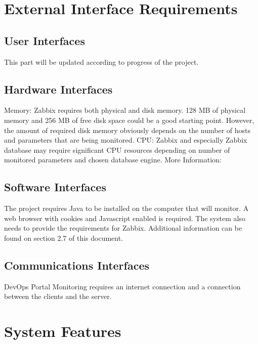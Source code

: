 \documentclass{article}
\newcommand{\MYhref}[3][blue]{\href{#2}{\color{#1}{#3}}}%
\begin{document}
\section{External Interface Requirements} 

	\subsection{User Interfaces}
This part will be updated according to progress of the project.
	\subsection{Hardware Interfaces}
Memory: \newline    Zabbix requires both physical and disk memory. 128 MB of physical memory and 256 MB of free disk space could be a good starting point. However, the amount of required disk memory obviously depends on the number of hosts and parameters that are being monitored.
\newline \newline
CPU: \newline   Zabbix and especially Zabbix database may require significant CPU resources depending on number of monitored parameters and chosen database engine.
 \newline  More Information:  \MYhref{https://www.zabbix.com/documentation/3.0/manual/installation/requirements}{https://www.zabbix.com/documentation/3.0/manual/installation/requirements}

	\subsection{Software Interfaces}
The project requires Java to be installed on the computer that will monitor. A web browser with cookies and Javascript enabled is required. The system also needs to provide the requirements for Zabbix. Additional information can be found on section 2.7 of this document.
	\subsection{Communications Interfaces}

DevOps Portal Monitoring requires an internet connection and a connection between the clients and the server.

\section{System Features} 
\end{document}
